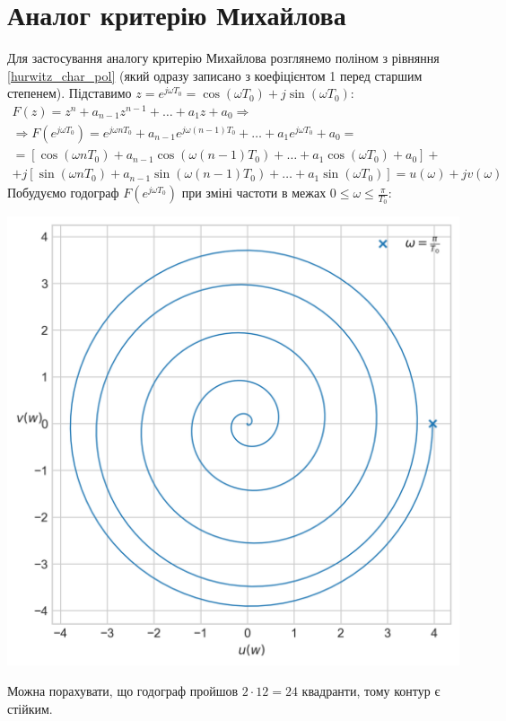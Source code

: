 \section{Аналог критерію Михайлова}
Для застосування аналогу критерію Михайлова розглянемо поліном з рівняння \eqref{hurwitz_char_pol} (який одразу записано з коефіцієнтом 1 перед старшим степенем).
Підставимо $z = e^{j \omega T_0} = \cos \left(\omega T_0\right) + j \sin \left(\omega T_0\right)$:
\begin{gather*}
    F(z) = z^n + a_{n-1} z^{n-1} + \dots + a_1 z + a_0 \Rightarrow \\
    \Rightarrow F\left(e^{j \omega T_0}\right) = 
    e^{j \omega n T_0} + a_{n-1} e^{j \omega (n-1) T_0} + \dots + a_1 e^{j \omega T_0} + a_0 = \\ =
    \left[
        \cos \left(\omega n T_0\right) + a_{n-1} \cos \left(\omega (n-1) T_0\right) + \dots + a_1 \cos \left(\omega T_0\right) + a_0
    \right] + \\ +
    j \left[
        \sin \left(\omega n T_0\right) + a_{n-1} \sin \left(\omega (n-1) T_0\right) + \dots + a_1 \sin \left(\omega T_0\right)
    \right] = u (\omega) + j v (\omega)
\end{gather*}
Побудуємо годограф $F\left(e^{j \omega T_0}\right)$ при зміні частоти в межах $0 \leq \omega \leq \frac{\pi}{T_0}$:
\begin{center}
    \includegraphics{pics/hodograph.png}
\end{center}
Можна порахувати, що годограф пройшов $2\cdot 12 = 24$ квадранти, тому контур є стійким.